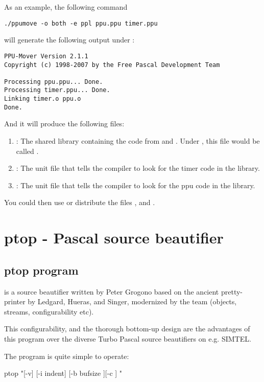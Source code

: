As an example, the following command
\begin{verbatim}
./ppumove -o both -e ppl ppu.ppu timer.ppu
\end{verbatim}
will generate the following output under \linux{}:
\begin{verbatim}
PPU-Mover Version 2.1.1
Copyright (c) 1998-2007 by the Free Pascal Development Team

Processing ppu.ppu... Done.
Processing timer.ppu... Done.
Linking timer.o ppu.o
Done.
\end{verbatim}
And it will produce the following files:
\begin{enumerate}
\item {} : The shared library containing the code from
 and . Under \windowsnt, this file would be called
.
\item {} : The unit file that tells the \fpc compiler to look
for the timer code in the library.
\item {} : The unit file that tells the \fpc compiler to look
for the ppu code in the library.
\end{enumerate}
You could then use or distribute the files , 
and .

\section{ptop - Pascal source beautifier}

\subsection{ptop program}

 is a source beautifier written by Peter Grogono based on the ancient pretty-printer
by Ledgard, Hueras, and Singer, modernized by the \fpc team (objects, streams, configurability
etc).

This configurability, and the thorough bottom-up design are the advantages of this program over
the diverse Turbo Pascal source beautifiers on e.g. SIMTEL.

The program is quite simple to operate:

ptop "[-v] [-i indent] [-b bufsize ][-c ]  "

